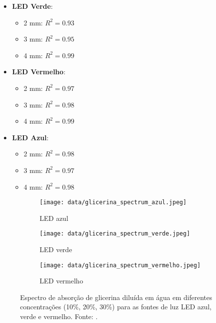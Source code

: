 \documentclass[a4paper]{ifacconf}
\begin{document}
\begin{itemize}
    \item \textbf{LED Verde}:
    \begin{itemize}
        \item 2 mm: \(R^2 = 0.93\)
        \item 3 mm: \(R^2 = 0.95\)
        \item 4 mm: \(R^2 = 0.99\)
    \end{itemize}
    \item \textbf{LED Vermelho}:
    \begin{itemize}
        \item 2 mm: \(R^2 = 0.97\)
        \item 3 mm: \(R^2 = 0.98\)
        \item 4 mm: \(R^2 = 0.99\)
    \end{itemize}
    \item \textbf{LED Azul}:
    \begin{itemize}
        \item 2 mm: \(R^2 = 0.98\)
        \item 3 mm: \(R^2 = 0.97\)
        \item 4 mm: \(R^2 = 0.98\)
    \end{itemize}
\end{itemize}

\begin{figure}[ht]
    \centering
    \begin{subfigure}{0.38\textwidth}
        \centering
        \texttt{[image: data/glicerina\_spectrum\_azul.jpeg]}
        \caption{LED azul}
        \label{fig:glicerina_azul}
    \end{subfigure}
    \begin{subfigure}{0.38\textwidth}
        \centering
        \texttt{[image: data/glicerina\_spectrum\_verde.jpeg]}
        \caption{LED verde}
        \label{fig:glicerina_verde}
    \end{subfigure}
    \begin{subfigure}{0.38\textwidth}
        \centering
        \texttt{[image: data/glicerina\_spectrum\_vermelho.jpeg]}
        \caption{LED vermelho}
        \label{fig:glicerina_vermelho}
    \end{subfigure}
    \caption{Espectro de absorção de glicerina diluída em água em diferentes concentrações (10\%, 20\%, 30\%) para as fontes de luz LED azul, verde e vermelho. Fonte: \cite{autoria_propria}.}
    \label{fig:glicerina_espectros}
\end{figure}
\end{document}
